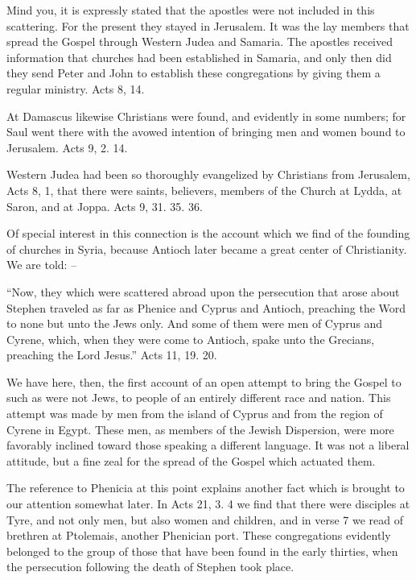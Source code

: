 \documentclass[
]{book}
\begin{document}
Mind you, it is expressly stated that the apostles were not included in this scattering. For the present they stayed in Jerusalem. It was the lay members that spread the Gospel through Western Judea and Samaria. The apostles received information that churches had been established in Samaria, and only then did they send Peter and John to establish these congregations by giving them a regular ministry. Acts 8, 14.

At Damascus likewise Christians were found, and evidently in some numbers; for Saul went there with the avowed intention of bringing men and women bound to Jerusalem. Acts 9, 2. 14.

Western Judea had been so thoroughly evangelized by Christians from Jerusalem, Acts 8, 1, that there were saints, believers, members of the Church at Lydda, at Saron, and at Joppa. Acts 9, 31. 35. 36.

Of special interest in this connection is the account which we find of the founding of churches in Syria, because Antioch later became a great center of Christianity. We are told: --

``Now, they which were scattered abroad upon the persecution that arose about Stephen traveled as far as Phenice and Cyprus and Antioch, preaching the Word to none but unto the Jews only. And some of them were men of Cyprus and Cyrene, which, when they were come to Antioch, spake unto the Grecians, preaching the Lord Jesus.'' Acts 11, 19. 20.

We have here, then, the first account of an open attempt to bring the Gospel to such as were not Jews, to people of an entirely different race and nation. This attempt was made by men from the island of Cyprus and from the region of Cyrene in Egypt. These men, as members of the Jewish Dispersion, were more favorably inclined toward those speaking a different language. It was not a liberal attitude, but a fine zeal for the spread of the Gospel which actuated them.

The reference to Phenicia at this point explains another fact which is brought to our attention somewhat later. In Acts 21, 3. 4 we find that there were disciples at Tyre, and not only men, but also women and children, and in verse 7 we read of brethren at Ptolemais, another Phenician port. These congregations evidently belonged to the group of those that have been found in the early thirties, when the persecution following the death of Stephen took place.
\end{document}
